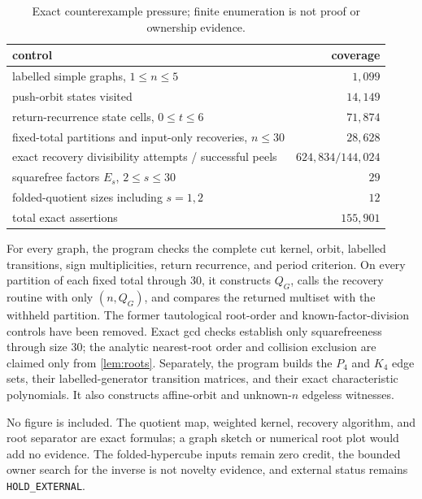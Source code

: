 \documentclass[10pt,a4paper]{amsart}
\theoremstyle{remark}
\begin{document}
\begin{table}[ht]
\centering
\caption{Exact counterexample pressure; finite enumeration is not proof or
ownership evidence.}\label{tab:controls}
\begin{tabular}{@{}lr@{}}
\toprule
control & coverage \\
\midrule
labelled simple graphs, $1\leq n\leq5$ & $1{,}099$ \\
push-orbit states visited & $14{,}149$ \\
return-recurrence state cells, $0\leq t\leq6$ & $71{,}874$ \\
fixed-total partitions and input-only recoveries, $n\leq30$ & $28{,}628$ \\
exact recovery divisibility attempts / successful peels
  & $624{,}834/144{,}024$ \\
squarefree factors $E_s$, $2\leq s\leq30$ & $29$ \\
folded-quotient sizes including $s=1,2$ & $12$ \\
total exact assertions & $155{,}901$ \\
\bottomrule
\end{tabular}
\end{table}

For every graph, the program checks the complete cut kernel, orbit, labelled
transitions, sign multiplicities, return recurrence, and period criterion.  On
every partition of each fixed total through $30$, it constructs $Q_G$, calls
the recovery routine with only $(n,Q_G)$, and compares the returned multiset
with the withheld partition.  The former tautological root-order and
known-factor-division controls have been removed.  Exact gcd checks establish
only squarefreeness through size $30$; the analytic nearest-root order and
collision exclusion are claimed only from \cref{lem:roots}.  Separately, the
program builds the $P_4$ and $K_4$ edge sets, their labelled-generator
transition matrices, and their exact characteristic polynomials.  It also
constructs affine-orbit and unknown-$n$ edgeless witnesses.

No figure is included.  The quotient map, weighted kernel, recovery algorithm,
and root separator are exact formulas; a graph sketch or numerical root plot
would add no evidence.  The folded-hypercube inputs remain zero credit, the
bounded owner search for the inverse is not novelty evidence, and external
status remains \texttt{HOLD\_EXTERNAL}.



\end{document}
